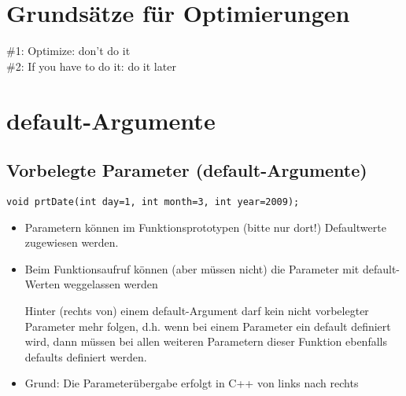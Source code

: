 
\section{Grundsätze für Optimierungen}
\label{sec:Grundsaetze fuer Optimierungen}
\LARGE{\#1: Optimize: don't do it}
\\
\LARGE{\#2: If you have to do it: do it later}
\normalsize


\section{default-Argumente}
\label{sec:default-Argumente}

\subsection{Vorbelegte Parameter (default-Argumente)}
\label{sec:Vorbelegte Parameter (default-Argumente)}
\begin{minipage}{\linewidth}
\begin{lstlisting}
void prtDate(int day=1, int month=3, int year=2009);
\end{lstlisting}
\end{minipage}
\normalsize
\begin{itemize}
	\item Parametern können im Funktionsprototypen (\color{red}bitte nur dort!\color{black}) Defaultwerte zugewiesen werden.
	\item Beim Funktionsaufruf können (aber müssen nicht) die Parameter mit default-Werten weggelassen werden
\\ \begin{achtung}Hinter (rechts von) einem default-Argument darf kein nicht vorbelegter Parameter mehr folgen, d.h. wenn bei einem Parameter ein default definiert wird, dann müssen bei allen weiteren Parametern dieser Funktion ebenfalls defaults definiert werden.
		\end{achtung}
	\item Grund: Die Parameterübergabe erfolgt in C++ von links nach rechts
\end{itemize}

